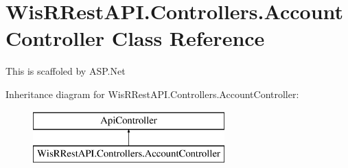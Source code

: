 \hypertarget{class_wis_r_rest_a_p_i_1_1_controllers_1_1_account_controller}{}\section{Wis\+R\+Rest\+A\+P\+I.\+Controllers.\+Account\+Controller Class Reference}
\label{class_wis_r_rest_a_p_i_1_1_controllers_1_1_account_controller}


This is scaffoled by A\+S\+P.\+Net  


Inheritance diagram for Wis\+R\+Rest\+A\+P\+I.\+Controllers.\+Account\+Controller\+:\begin{figure}[H]
\begin{center}
\leavevmode
\includegraphics[height=2.000000cm]{class_wis_r_rest_a_p_i_1_1_controllers_1_1_account_controller}
\end{center}
\end{figure}
